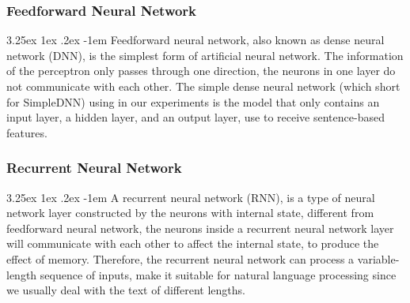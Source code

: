 \documentclass[12pt]{article}
\makeatletter
\renewcommand\paragraph{\@startsection{paragraph}{5}{\z@}%
  {3.25ex \@plus1ex \@minus.2ex}%
  {-1em}%
  {\normalfont\normalsize\bfseries}}
\makeatother
\begin{document}
\begin{CJK*}{UTF8}{bkai}
\begin{spacing}{1.77}
\subsubsection{Feedforward Neural Network}
\paragraph{}
Feedforward neural network, also known as dense neural network (DNN), is the simplest form of artificial neural network. The information of the perceptron only passes through one direction, the neurons in one layer do not communicate with each other. The simple dense neural network (which short for SimpleDNN) using in our experiments is the model that only contains an input layer, a hidden layer, and an output layer, use to receive sentence-based features.

\subsubsection{Recurrent Neural Network}
\paragraph{}
A recurrent neural network (RNN), is a type of neural network layer constructed by the neurons with internal state, different from feedforward neural network, the neurons inside a recurrent neural network layer will communicate with each other to affect the internal state, to produce the effect of memory. Therefore, the recurrent neural network can process a variable-length sequence of inputs, make it suitable for natural language processing since we usually deal with the text of different lengths.


\end{spacing}
\end{CJK*}
\end{document}
